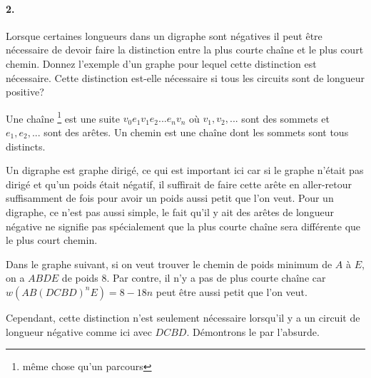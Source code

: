 \paragraph{2. } Lorsque certaines longueurs dans un digraphe sont négatives il peut être nécessaire de devoir faire la distinction entre la plus courte chaîne et le plus court chemin. Donnez l'exemple d'un graphe pour lequel cette distinction est nécessaire. Cette distinction est-elle nécessaire si tous les circuits sont de longueur positive?
\begin{solution}
Une chaîne \footnote{même chose qu'un parcours} est une suite $v_0e_1v_1e_2...e_nv_n $ où $v_1,v_2,...$ sont des sommets et $e_1,e_2,...$ sont des arêtes.  Un chemin est une chaîne dont les sommets sont tous distincts.

Un digraphe est graphe dirigé, ce qui est important ici car si le graphe n'était pas dirigé et qu'un poids
était négatif, il suffirait de faire cette arête en aller-retour suffisamment de fois pour avoir un poids aussi petit que l'on veut.
Pour un digraphe, ce n'est pas aussi simple, le fait qu'il y ait des arêtes de longueur négative ne signifie pas spécialement que la plus courte chaîne sera différente que le plus court chemin.

  Dans le graphe suivant, si on veut trouver le chemin de poids minimum de $A$ à $E$, on a $ABDE$ de poids $8$.
  Par contre, il n'y a pas de plus courte chaîne car $w(AB(DCBD)^nE) = 8 - 18n$ peut être aussi
  petit que l'on veut.

  \begin{center}
  \end{center}

  Cependant, cette distinction n'est seulement nécessaire lorsqu'il y a
  un circuit de longueur négative comme ici avec $DCBD$.
  Démontrons le par l'absurde.\\


\end{solution}
